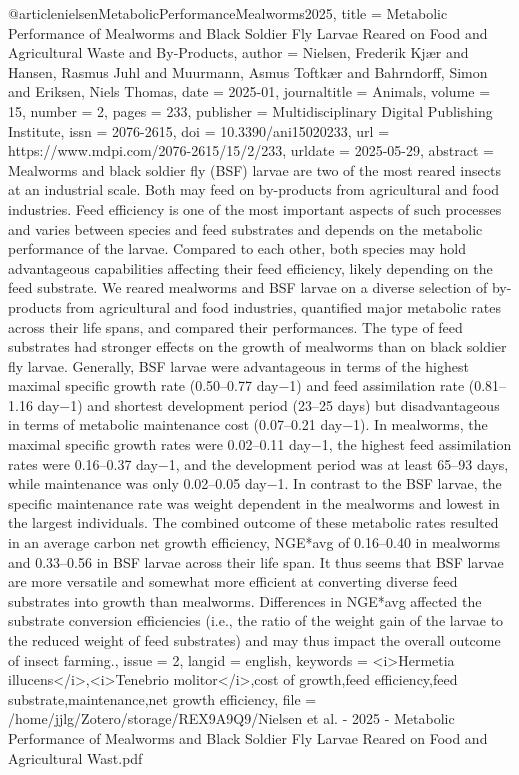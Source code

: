 {{{{@article{nielsenMetabolicPerformanceMealworms2025,
  title = {Metabolic {{Performance}} of {{Mealworms}} and {{Black Soldier Fly Larvae Reared}} on {{Food}} and {{Agricultural Waste}} and {{By-Products}}},
  author = {Nielsen, Frederik Kjær and Hansen, Rasmus Juhl and Muurmann, Asmus Toftkær and Bahrndorff, Simon and Eriksen, Niels Thomas},
  date = {2025-01},
  journaltitle = {Animals},
  volume = {15},
  number = {2},
  pages = {233},
  publisher = {Multidisciplinary Digital Publishing Institute},
  issn = {2076-2615},
  doi = {10.3390/ani15020233},
  url = {https://www.mdpi.com/2076-2615/15/2/233},
  urldate = {2025-05-29},
  abstract = {Mealworms and black soldier fly (BSF) larvae are two of the most reared insects at an industrial scale. Both may feed on by-products from agricultural and food industries. Feed efficiency is one of the most important aspects of such processes and varies between species and feed substrates and depends on the metabolic performance of the larvae. Compared to each other, both species may hold advantageous capabilities affecting their feed efficiency, likely depending on the feed substrate. We reared mealworms and BSF larvae on a diverse selection of by-products from agricultural and food industries, quantified major metabolic rates across their life spans, and compared their performances. The type of feed substrates had stronger effects on the growth of mealworms than on black soldier fly larvae. Generally, BSF larvae were advantageous in terms of the highest maximal specific growth rate (0.50–0.77 day−1) and feed assimilation rate (0.81–1.16 day−1) and shortest development period (23–25 days) but disadvantageous in terms of metabolic maintenance cost (0.07–0.21 day−1). In mealworms, the maximal specific growth rates were 0.02–0.11 day−1, the highest feed assimilation rates were 0.16–0.37 day−1, and the development period was at least 65–93 days, while maintenance was only 0.02–0.05 day−1. In contrast to the BSF larvae, the specific maintenance rate was weight dependent in the mealworms and lowest in the largest individuals. The combined outcome of these metabolic rates resulted in an average carbon net growth efficiency, NGE*avg of 0.16–0.40 in mealworms and 0.33–0.56 in BSF larvae across their life span. It thus seems that BSF larvae are more versatile and somewhat more efficient at converting diverse feed substrates into growth than mealworms. Differences in NGE*avg affected the substrate conversion efficiencies (i.e., the ratio of the weight gain of the larvae to the reduced weight of feed substrates) and may thus impact the overall outcome of insect farming.},
  issue = {2},
  langid = {english},
  keywords = {<i>Hermetia illucens</i>,<i>Tenebrio molitor</i>,cost of growth,feed efficiency,feed substrate,maintenance,net growth efficiency},
  file = {/home/jjlg/Zotero/storage/REX9A9Q9/Nielsen et al. - 2025 - Metabolic Performance of Mealworms and Black Soldier Fly Larvae Reared on Food and Agricultural Wast.pdf}
}

}}}}
